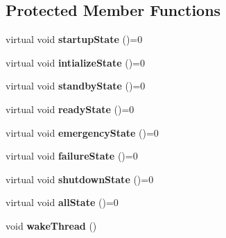\subsection*{\-Protected \-Member \-Functions}
\begin{DoxyCompactItemize}
\item 
\hypertarget{class_local_component_af04950b467e7d8f73062317f7ee4ad3d}{virtual void {\bfseries startup\-State} ()=0}\label{class_local_component_af04950b467e7d8f73062317f7ee4ad3d}

\item 
\hypertarget{class_local_component_a8f308942f953562f2ce477c5103bd377}{virtual void {\bfseries intialize\-State} ()=0}\label{class_local_component_a8f308942f953562f2ce477c5103bd377}

\item 
\hypertarget{class_local_component_ab9590b0b22f6c639cf4a5e8f722ce137}{virtual void {\bfseries standby\-State} ()=0}\label{class_local_component_ab9590b0b22f6c639cf4a5e8f722ce137}

\item 
\hypertarget{class_local_component_a9b94f98683c0a3f7bf0576837d9d9bde}{virtual void {\bfseries ready\-State} ()=0}\label{class_local_component_a9b94f98683c0a3f7bf0576837d9d9bde}

\item 
\hypertarget{class_local_component_a33396ea26b8bf95572d693eb79d8cc1c}{virtual void {\bfseries emergency\-State} ()=0}\label{class_local_component_a33396ea26b8bf95572d693eb79d8cc1c}

\item 
\hypertarget{class_local_component_a9df8c59c1de1ba666a77dad1be1bcd8f}{virtual void {\bfseries failure\-State} ()=0}\label{class_local_component_a9df8c59c1de1ba666a77dad1be1bcd8f}

\item 
\hypertarget{class_local_component_a640bdcb4892589082b67e7ba09f1a1a0}{virtual void {\bfseries shutdown\-State} ()=0}\label{class_local_component_a640bdcb4892589082b67e7ba09f1a1a0}

\item 
\hypertarget{class_local_component_ae31d68dd0e59aec68ba856e141a3051d}{virtual void {\bfseries all\-State} ()=0}\label{class_local_component_ae31d68dd0e59aec68ba856e141a3051d}

\item 
\hypertarget{class_local_component_ab8992e20786c0c7c790fa15f2d124908}{void {\bfseries wake\-Thread} ()}\label{class_local_component_ab8992e20786c0c7c790fa15f2d124908}

\end{DoxyCompactItemize}
